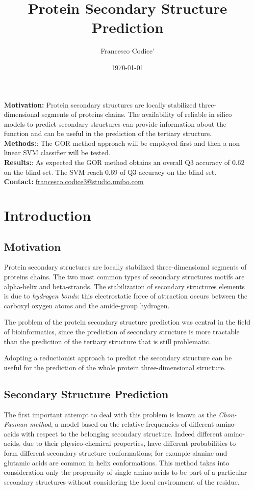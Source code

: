 \documentclass[a4paper,twocolumn]{article}
\author{Francesco Codice'}
\date{\today}
\title{Protein Secondary Structure Prediction}
\begin{document}
\maketitle
{}
\abstract{}
\textbf{Motivation:} Protein secondary structures are locally stabilized
three-dimensional segments of proteins chains. The availability of reliable in
silico models to predict secondary structures can provide information about the
function and can be useful in the prediction of the tertiary structure.\\
\textbf{Methods:}: The GOR
method approach will be employed first and then a non linear SVM classifier will be tested.\\
\textbf{Results:}: As expected the GOR method obtains an overall Q3 accuracy of 0.62 on
the blind-set. The SVM reach 0.69 of Q3 accuracy on the blind set.\\
\textbf{Contact:} \href{francesco.codice3@studio.unibo.com}{francesco.codice3@studio.unibo.com}\\
\section{Introduction}
\label{sec:org4533079}
\subsection{Motivation}
\label{sec:org23f3dbb}
Protein secondary structures are locally stabilized three-dimensional segments
of proteins chains. The two most common types of secondary structures motifs are
alpha-helix and beta-strands. The stabilization of secondary structures elements is due
to \emph{hydrogen bonds}: this electrostatic force of attraction occurs between
the carboxyl oxygen atoms and the amide-group hydrogen.

The problem of the protein secondary structure prediction was central in the
field of bioinformatics, since the prediction of secondary structure is more
tractable than the prediction of the tertiary structure that is still problematic.

Adopting a reductionist approach to predict the secondary structure can be
useful for the prediction of the whole protein three-dimensional structure.


\subsection{Secondary Structure Prediction}
\label{sec:org45aab29}
The first important attempt to deal with this problem is known as the
\emph{Chou-Fasman method}, a model based on the relative frequencies of different
amino-acids with respect to the belonging secondary structure.
Indeed different amino-acids, due to their physico-chemical properties, have different
probabilities to form different secondary structure conformations; for example alanine and
glutamic acids are common in helix conformations.
This method takes into consideration only the propensity of single amino acids
to be part of a particular secondary structures without considering the local
environment of the residue. \cite{chou}
\end{document}
